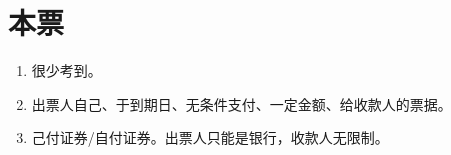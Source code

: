 \section{本票}
\begin{enumerate}
  \item 很少考到。
  \item 出票人自己、于到期日、无条件支付、一定金额、给收款人的票据。
  \item 己付证券/自付证券。出票人只能是银行，收款人无限制。
\end{enumerate}
